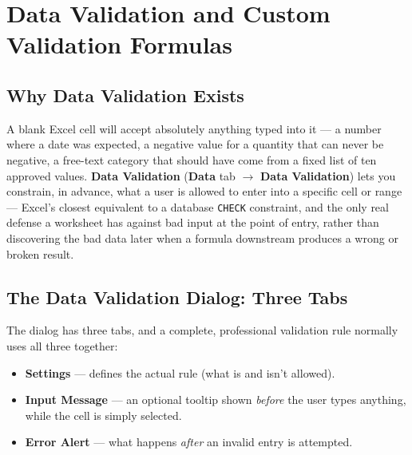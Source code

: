 \documentclass[11pt,a4paper]{article}
\begin{document}
\section{Data Validation and Custom Validation Formulas}
\label{sec:datavalidation}

\subsection{Why Data Validation Exists}

\begin{keyconcept}
A blank Excel cell will accept absolutely anything typed into it --- a number where a date was expected, a negative value for a quantity that can never be negative, a free-text category that should have come from a fixed list of ten approved values. \textbf{Data Validation} (\textbf{Data} tab $\rightarrow$ \textbf{Data Validation}) lets you constrain, in advance, what a user is allowed to enter into a specific cell or range --- Excel's closest equivalent to a database \texttt{CHECK} constraint, and the only real defense a worksheet has against bad input at the point of entry, rather than discovering the bad data later when a formula downstream produces a wrong or broken result.
\end{keyconcept}

\subsection{The Data Validation Dialog: Three Tabs}

\begin{formulasyntax}
The dialog has three tabs, and a complete, professional validation rule normally uses all three together:
\begin{itemize}
  \item \textbf{Settings} --- defines the actual rule (what is and isn't allowed).
  \item \textbf{Input Message} --- an optional tooltip shown \emph{before} the user types anything, while the cell is simply selected.
  \item \textbf{Error Alert} --- what happens \emph{after} an invalid entry is attempted.
\end{itemize}
\end{formulasyntax}
\end{document}
